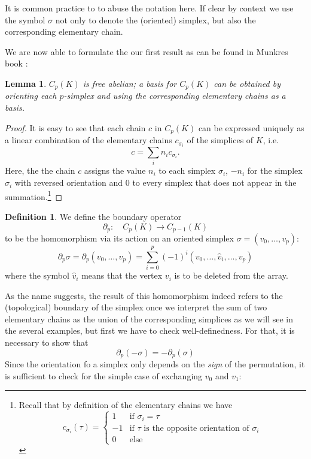 \documentclass[draft]{scrartcl}
\theoremstyle{plain}
\newtheorem{lemma}[theorem]{Lemma}
\theoremstyle{definition}
\newtheorem	{definition}[theorem]{Definition}
\theoremstyle{remark}
\begin{document}
It is common practice to to abuse the notation here. If clear by context we use the symbol $\sigma$ not only to denote the (oriented) simplex, but also the corresponding elementary chain.

We are now able to formulate the our first result as can be found in Munkres book \cite[Lemma 5.1, p. 28]{mu}:
\begin{lemma}
	$C_p(K)$ is free abelian; a basis for $C_p(K)$ can be obtained by orienting each $p$-simplex and using the corresponding elementary chains as a basis.
\end{lemma}

\begin{proof}
	It is easy to see that each chain $c$ in $C_p(K)$ can be expressed uniquely as a linear combination of the elementary chains $c_{\sigma_i}$ of the simplices of $K$, i.e.
	\[
	c=\sum_{i}n_i c_{\sigma_i}.
	\]
	Here, the the chain $c$ assigns the value $n_i$ to each simplex $\sigma_i$, $-n_i$ for the simplex $\sigma_i$ with reversed orientation and $0$ to every simplex that does not appear in the summation.\footnote{Recall that by definition of the elementary chains we have \[c_{\sigma_i}(\tau)=\begin{cases}
		1 &\text{if }\sigma_i=\tau\\
		-1&\text{if }\tau \text{ is the opposite orientation of }\sigma_i\\
		0&\text{else}
		\end{cases}
		\]}
\end{proof}

\begin{definition}
	We define the boundary operator 
	\[
	\partial_p:\quad C_p(K)\to C_{p-1}(K)
	\]
	to be the homomorphism via its action on an oriented simplex $\sigma=(v_0,\dots,v_p)$:
	\[
	\partial_p\sigma=\partial_p(v_0,\dots,v_p)=\sum_{i=0}^{p}(-1)^i(v_0,\dots,\hat{v}_i,\dots,v_p)
	\]
	where the symbol $\hat{v}_i$ means that the vertex $v_i$ is to be deleted from the array.
\end{definition}

As the name suggests, the result of this homomorphism indeed refers to the (topological) boundary of the simplex once we interpret the sum of two elementary chains as the union of the corresponding simplices as we will see in the several examples, but first we have to check well-definedness. For that, it is necessary to show that
\[\partial_p(-\sigma)=-\partial_p(\sigma) 
\]
Since the orientation fo a simplex only depends on the \emph{sign} of the permutation, it is sufficient to check for the simple case of exchanging $v_0$ and $v_1$:
\end{document}
